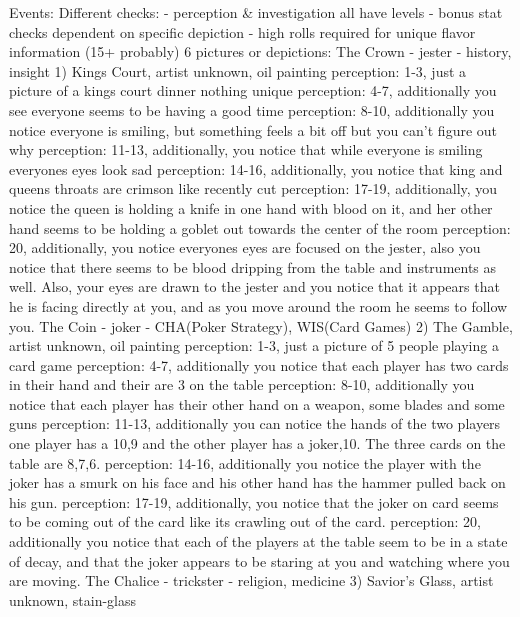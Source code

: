 Events:
Different checks:
 - perception & investigation all have levels
 - bonus stat checks dependent on specific depiction
 - high rolls required for unique flavor information (15+ probably)
6 pictures or depictions: 
    The Crown - jester - history, insight 
    1) Kings Court, artist unknown, oil painting
        perception: 1-3, just a picture of a kings court dinner nothing unique
        perception: 4-7, additionally you see everyone seems to be having a good time
        perception: 8-10, additionally you notice everyone is smiling, but something feels a bit off but you can't figure out why
        perception: 11-13, additionally, you notice that while everyone is smiling everyones eyes look sad
        perception: 14-16, additionally, you notice that king and queens throats are crimson like recently cut
        perception: 17-19, additionally, you notice the queen is holding a knife in one hand with blood on it, and her other hand seems to be holding a goblet out towards the center of the room
        perception: 20, additionally, you notice everyones eyes are focused on the jester, also you notice that there seems to be blood dripping from the table and instruments as well. 
                    Also, your eyes are drawn to the jester and you notice that it appears that he is facing directly at you, and as you move around the room he seems to follow you.
    The Coin - joker - CHA(Poker Strategy), WIS(Card Games)
    2) The Gamble, artist unknown, oil painting
        perception: 1-3, just a picture of 5 people playing a card game
        perception: 4-7, additionally you notice that each player has two cards in their hand and their are 3 on the table
        perception: 8-10, additionally you notice that each player has their other hand on a weapon, some blades and some guns
        perception: 11-13, additionally you can notice the hands of the two players one player has a 10,9 and the other player has a joker,10. The three cards on the table are 8,7,6.
        perception: 14-16, additionally you notice the player with the joker has a smurk on his face and his other hand has the hammer pulled back on his gun.
        perception: 17-19, additionally, you notice that the joker on card seems to be coming out of the card like its crawling out of the card.
        perception: 20, additionally you notice that each of the players at the table seem to be in a state of decay, and that the joker appears to be staring at you and watching where you are moving. 
    The Chalice - trickster - religion, medicine 
    3) Savior's Glass, artist unknown, stain-glass
